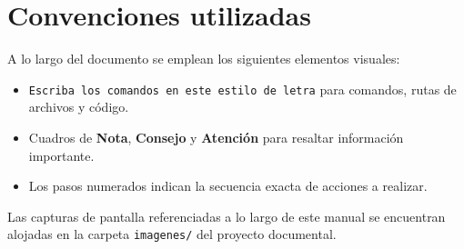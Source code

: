 \section{Convenciones utilizadas}
A lo largo del documento se emplean los siguientes elementos visuales:
\begin{itemize}
    \item \texttt{Escriba los comandos en este estilo de letra} para comandos, rutas de archivos y código.
    \item Cuadros de \textbf{Nota}, \textbf{Consejo} y \textbf{Atención} para resaltar información importante.
    \item Los pasos numerados indican la secuencia exacta de acciones a realizar.
\end{itemize}

\begin{nota}
Las capturas de pantalla referenciadas a lo largo de este manual se encuentran alojadas en la carpeta \texttt{imagenes/} del proyecto documental.
\end{nota}
